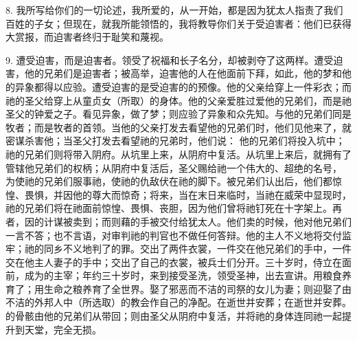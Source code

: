 8. 我所写给你们的一切论述，我所爱的，从一开始，都是因为犹太人指责了我们百姓的子女；但现在，就我所能领悟的，我将教导你们关于受迫害者：他们已获得大赏报，而迫害者终归于耻笑和蔑视。\par

9. 遭受迫害，而是迫害者。领受了祝福和长子名分，却被剥夺了这两样。遭受迫害，他的兄弟们是迫害者；被高举，迫害他的人在他面前下拜，如此，他的梦和他的异象都得以应验。遭受迫害的是受迫害的的预像。他的父亲给穿上一件彩衣；而祂的圣父给穿上从童贞女（所取）的身体。他的父亲爱胜过爱他的兄弟们，而是祂圣父的钟爱之子。看见异象，做了梦；则应验了异象和众先知。与他的兄弟们同是牧者；而是牧者的首领。当他的父亲打发去看望他的兄弟们时，他们见他来了，就密谋杀害他；当圣父打发去看望祂的兄弟时，他们说： 他的兄弟们将投入坑中；祂的兄弟们则将带入阴府。从坑里上来，从阴府中复活。从坑里上来后，就拥有了管辖他兄弟们的权柄；从阴府中复活后，圣父赐给祂一个伟大的、超绝的名号， 为使祂的兄弟们服事祂，使祂的仇敌伏在祂的脚下。被兄弟们认出后，他们都惊惶、畏惧，并因他的尊大而惊奇；将来，当在末日来临时，当祂在威荣中显现时，祂的兄弟们将在祂面前惊惶、畏惧、丧胆，因为他们曾将祂钉死在十字架上。再者，因的计谋被卖到；而则藉的手被交付给犹太人。他们卖的时候，他对他兄弟们一言不答；也不言语，对审判祂的判官也不做任何答辩。他的主人不义地将交付监牢；祂的同乡不义地判了的罪。交出了两件衣裳，一件交在他兄弟们的手中，一件交在他主人妻子的手中；交出了自己的衣裳，被兵士们分开。三十岁时，侍立在面前，成为的主宰；年约三十岁时，来到接受圣洗，领受圣神，出去宣讲。用粮食养育了；用生命之粮养育了全世界。娶了邪恶而不洁的司祭的女儿为妻；则迎娶了由不洁的外邦人中（所选取）的教会作自己的净配。在逝世并安葬；在逝世并安葬。的骨骸由他的兄弟们从带回；则由圣父从阴府中复活，并将祂的身体连同祂一起提升到天堂，完全无损。\par

